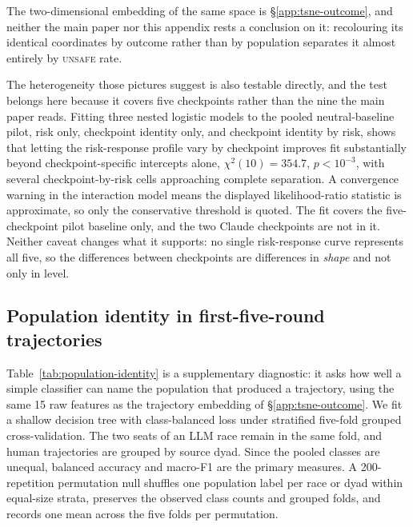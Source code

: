 \documentclass{article}
\newcommand{\Unsafe}{\textsc{unsafe}}
\begin{document}
The two-dimensional embedding of the same space is
\S\ref{app:tsne-outcome}, and neither the main paper nor this
appendix rests a conclusion on it: recolouring its identical coordinates by
outcome rather than by population separates it almost entirely by \Unsafe{}
rate.

The heterogeneity those pictures suggest is also testable directly, and the
test belongs here because it covers five checkpoints rather than the nine the
main paper reads. Fitting three nested logistic models to the pooled
neutral-baseline pilot, risk only, checkpoint identity only, and checkpoint
identity by risk, shows that letting the risk-response profile vary by
checkpoint improves fit substantially beyond checkpoint-specific intercepts
alone, $\chi^2(10)=354.7$, $p<10^{-3}$, with several checkpoint-by-risk cells
approaching complete separation. A convergence warning in the interaction model
means the displayed likelihood-ratio statistic is approximate, so only the
conservative threshold is quoted. The fit covers the five-checkpoint pilot
baseline only, and the two Claude checkpoints are not in it. Neither caveat
changes what it supports: no single risk-response curve represents all five, so
the differences between checkpoints are differences in \emph{shape} and not
only in level.

\subsection{Population identity in first-five-round trajectories}
\label{app:population-identity}

Table~\ref{tab:population-identity} is a supplementary diagnostic: it asks how
well a simple classifier can name the population that
produced a trajectory, using the same 15 raw features as the trajectory
embedding of \S\ref{app:tsne-outcome}. We fit a shallow decision tree with
class-balanced loss under stratified five-fold grouped cross-validation. The
two seats of an LLM race remain in the same fold, and human trajectories are
grouped by source dyad. Since the pooled classes are unequal, balanced accuracy
and macro-F1 are the primary measures. A 200-repetition permutation null
shuffles one population label per race or dyad within equal-size strata,
preserves the observed class counts and grouped folds, and records one mean
across the five folds per permutation.
\end{document}
